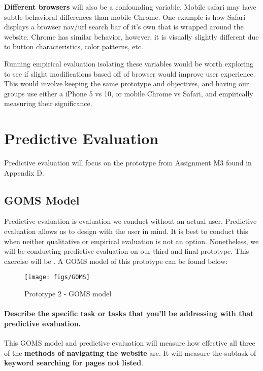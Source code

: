 \textbf{Different browsers} will also be a confounding variable. Mobile safari may have subtle behavioral differences than mobile Chrome. One example is how Safari displays a browser nav/url search bar of it's own that is wrapped around the website. Chrome has similar behavior, however, it is visually slightly different due to button characteristics, color patterns, etc.

Running empirical evaluation isolating these variables would be worth exploring to see if slight modifications based off of browser would improve user experience. This would involve keeping the same prototype and objectives, and having our groups use either a iPhone 5 vs 10, or mobile Chrome vs Safari, and empirically measuring their significance.

\section{Predictive Evaluation}
Predictive evaluation will focus on the prototype from Assignment M3 found in Appendix D.

\subsection{GOMS Model}
Predictive evaluation is evaluation we conduct without an actual user. Predictive evaluation allows us to design with the user in mind. It is best to conduct this when neither qualitative or empirical evaluation is not an option. Nonetheless, we will be conducting predictive evaluation on our third and final prototype. This exercise will be . A GOMS model of this prototype can be found below:

\begin{figure}[H]
  \centering
  \texttt{[image: figs/GOMS]}
  \caption{Prototype 2 - GOMS model}
  \label{fig::1}
\end{figure}

\paragraph{Describe the specific task or tasks that you’ll be addressing with that predictive evaluation.} This GOMS model and predictive evaluation will measure how effective all three of the \textbf{methods of navigating the website} are. It will measure the subtask of \textbf{keyword searching for pages not listed}.

